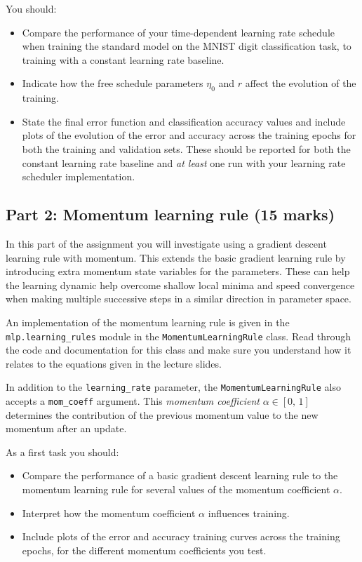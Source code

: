 \documentclass[11pt,]{article}
\begin{document}
You should:

\begin{itemize}
\itemsep1pt\parskip0pt
\item
  Compare the performance of your time-dependent learning rate schedule
  when training the standard model on the MNIST digit classification
  task, to training with a constant learning rate baseline.
\item
  Indicate how the free schedule parameters $\eta_0$ and $r$ affect the
  evolution of the training.
\item
  State the final error function and classification accuracy values and
  include plots of the evolution of the error and accuracy across the
  training epochs for both the training and validation sets. These
  should be reported for both the constant learning rate baseline and
  \emph{at least} one run with your learning rate scheduler
  implementation.
\end{itemize}

\subsection{Part 2: Momentum learning rule (15
marks)}\label{part-2-momentum-learning-rule-15-marks}

In this part of the assignment you will investigate using a gradient
descent learning rule with momentum. This extends the basic gradient
learning rule by introducing extra momentum state variables for the
parameters. These can help the learning dynamic help overcome shallow
local minima and speed convergence when making multiple successive steps
in a similar direction in parameter space.

An implementation of the momentum learning rule is given in the
\texttt{mlp.learning\_rules} module in the \texttt{MomentumLearningRule}
class. Read through the code and documentation for this class and make
sure you understand how it relates to the equations given in the lecture
slides.

In addition to the \texttt{learning\_rate} parameter, the
\texttt{MomentumLearningRule} also accepts a \texttt{mom\_coeff}
argument. This \emph{momentum coefficient} $\alpha \in [0,\,1]$
determines the contribution of the previous momentum value to the new
momentum after an update.

\newpage
As a first task you should:

\begin{itemize}
\itemsep1pt\parskip0pt
\item
  Compare the performance of a basic gradient descent learning rule to
  the momentum learning rule for several values of the momentum
  coefficient $\alpha$.
\item
  Interpret how the momentum coefficient $\alpha$ influences training.
\item
  Include plots of the error and accuracy training curves across the
  training epochs, for the different momentum coefficients you test.
\end{itemize}
\end{document}
